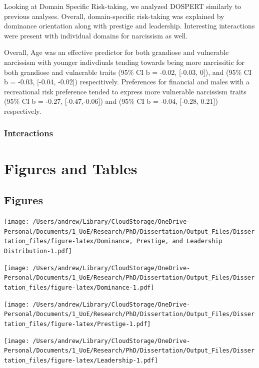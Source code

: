 \documentclass[
  donotrepeattitle,doc, 12pt, a4paper,floatsintext]{apa7}
\begin{document}
Looking at Domain Specific Risk-taking, we analyzed DOSPERT similarly to previous analyses. Overall, domain-specific risk-taking was explained by dominance orientation along with prestige and leadership. Interesting interactions were present with individual domains for narcissism as well.

Overall, Age was an effective predictor for both grandiose and vulnerable narcissism with younger indivdiuals tending towards being more narcissitic for both grandiose and vulnerable traits (95\% CI b = -0.02, {[}-0.03, 0{]}), and (95\% CI b = -0.03, {[}-0.04, -0.02{]}) respecitively. Preferences for financial and males with a recreational risk preference tended to express more vulnerable narcissism traits (95\% CI b = -0.27, {[}-0.47,-0.06{]}) and (95\% CI b = -0.04, {[}-0.28, 0.21{]}) respectively.

\hypertarget{interactions-2}{%
\subsubsection{Interactions}\label{interactions-2}}

\newpage

\hypertarget{figures-and-tables}{%
\section{Figures and Tables}\label{figures-and-tables}}

\hypertarget{figures}{%
\subsection{Figures}\label{figures}}

\texttt{[image: /Users/andrew/Library/CloudStorage/OneDrive-Personal/Documents/1\_UoE/Research/PhD/Dissertation/Output\_Files/Dissertation\_files/figure-latex/Dominance, Prestige, and Leadership Distribution-1.pdf]}

\texttt{[image: /Users/andrew/Library/CloudStorage/OneDrive-Personal/Documents/1\_UoE/Research/PhD/Dissertation/Output\_Files/Dissertation\_files/figure-latex/Dominance-1.pdf]}

\texttt{[image: /Users/andrew/Library/CloudStorage/OneDrive-Personal/Documents/1\_UoE/Research/PhD/Dissertation/Output\_Files/Dissertation\_files/figure-latex/Prestige-1.pdf]}

\texttt{[image: /Users/andrew/Library/CloudStorage/OneDrive-Personal/Documents/1\_UoE/Research/PhD/Dissertation/Output\_Files/Dissertation\_files/figure-latex/Leadership-1.pdf]}
\end{document}
